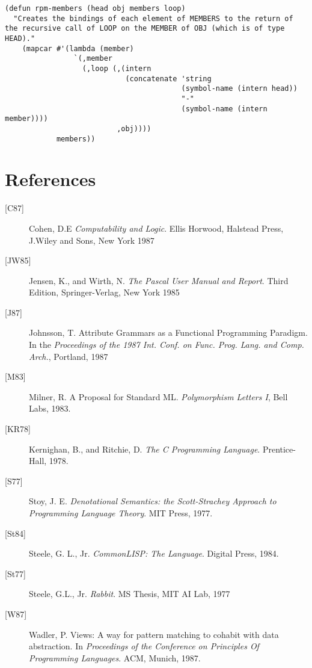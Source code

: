 \documentclass[a4paper,11pt]{article}
\begin{document}
\begin{verbatim}
(defun rpm-members (head obj members loop)
  "Creates the bindings of each element of MEMBERS to the return of
the recursive call of LOOP on the MEMBER of OBJ (which is of type HEAD)."
    (mapcar #'(lambda (member)
                `(,member
                  (,loop (,(intern 
                            (concatenate 'string
                                         (symbol-name (intern head))
                                         "-"
                                         (symbol-name (intern member))))
                          ,obj))))
            members))
\end{verbatim}

\section*{References}

\begin{description}
\item[\mbox{[C87]}]
        Cohen, D.E \emph{Computability and Logic}. Ellis Horwood,
Halstead Press, J.Wiley and Sons, New York 1987
\item[\mbox{[JW85]}]
        Jensen, K., and Wirth, N. \emph{The Pascal User Manual and
Report}. Third Edition, Springer-Verlag, New York 1985
\item[\mbox{[J87]}]
	Johnsson, T. Attribute Grammars as a Functional Programming
Paradigm. In the \emph{Proceedings of the 1987 Int. Conf. on Func. Prog.
Lang. and Comp. Arch.}, Portland, 1987
\item[\mbox{[M83]}]
        Milner, R. A Proposal for Standard ML. \emph{Polymorphism Letters I},
Bell Labs, 1983.
\item[\mbox{[KR78]}]
        Kernighan, B., and Ritchie, D. \emph{The C Programming
Language}. Prentice-Hall, 1978.
\item[\mbox{[S77]}]
        Stoy, J. E. \emph{Denotational Semantics: the Scott-Strachey
Approach to Programming Language Theory}. MIT Press, 1977.
\item[\mbox{[St84]}]
        Steele, G. L., Jr. \emph{CommonLISP: The Language}. Digital Press, 1984.
\item[\mbox{[St77]}]
        Steele, G.L., Jr. \emph{Rabbit}. MS Thesis, MIT AI Lab, 1977
\item[\mbox{[W87]}]
        Wadler, P. Views: A way for pattern matching to cohabit with
data abstraction. In \emph{Proceedings of the Conference on Principles
Of Programming Languages}. ACM, Munich, 1987.
\end{description}
\end{document}
